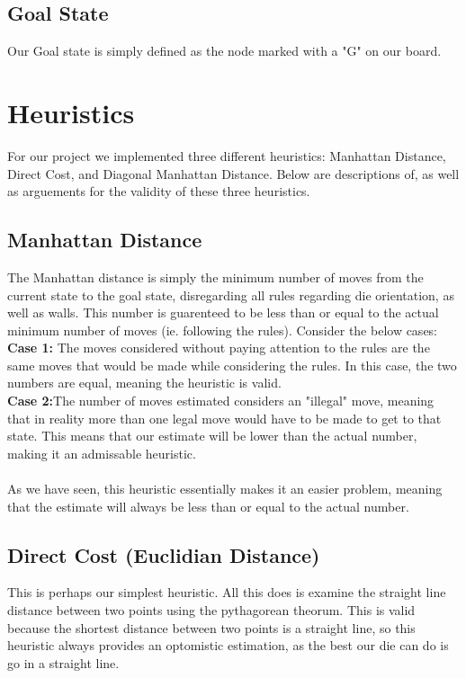 \documentclass{article}
\begin{document}
\subsection*{Goal State}
Our Goal state is simply defined as the node marked with a "G" on our board.  
\section*{Heuristics}
For our project we implemented three different heuristics: Manhattan Distance, Direct Cost, and Diagonal Manhattan Distance.  Below are descriptions of, as well as arguements for the validity of these three heuristics.
\subsection*{Manhattan Distance}
The Manhattan distance is simply the minimum number of moves from the current state to the goal state, disregarding all rules regarding die orientation, as well as walls.  This number is guarenteed to be less than or equal to the actual minimum number of moves (ie. following the rules).  Consider the below cases:\\
\textbf{Case 1:} The moves considered without paying attention to the rules are the same moves that would be made while considering the rules.  In this case, the two numbers are equal, meaning the heuristic is valid.\\
\textbf{Case 2:}The number of moves estimated considers an "illegal" move, meaning that in reality more than one legal move would have to be made to get to that state.  This means that our estimate will be lower than the actual number, making it an admissable heuristic.\\\\
As we have seen, this heuristic essentially makes it an easier problem, meaning that the estimate will always be less than or equal to the actual number.  
\subsection*{Direct Cost (Euclidian Distance)}
This is perhaps our simplest heuristic.  All this does is examine the straight line distance between two points using the pythagorean theorum.  This is valid because the shortest distance between two points is a straight line, so this heuristic always provides an optomistic estimation, as the best our die can do is go in a straight line.
\end{document}
